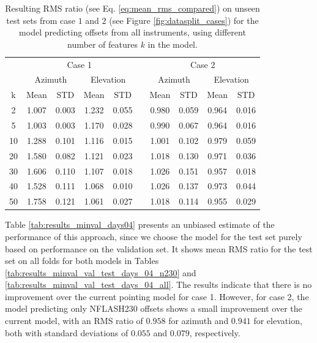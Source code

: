 \begin{table}[!htbp]
    \centering
    \caption{%
    Resulting RMS ratio (see Eq. \eqref{eq:mean_rms_compared}) on unseen test sets from case $1$ and $2$ (see Figure \ref{fig:datasplit_cases}) for the model predicting offsets from all instruments,
    using different number of features $k$ in the model.}
    \begin{tabular}{ccccc c cccc}
        \toprule
        \multicolumn{1}{c}{} & \multicolumn{4}{c}{Case 1} & & \multicolumn{4}{c}{Case 2} \\
        \cmidrule(lr){2-5} \cmidrule(lr){7-10}
        \multicolumn{1}{c}{} & \multicolumn{2}{c}{Azimuth} & \multicolumn{2}{c}{Elevation} & & \multicolumn{2}{c}{Azimuth} & \multicolumn{2}{c}{Elevation} \\ 
        \cmidrule(lr){2-5} \cmidrule(lr){7-10}
        k & Mean & STD & Mean & STD & & Mean & STD & Mean & STD \\ 
        \midrule
         2 &     1.007 &     0.003 &     1.232 &     0.055 &  &  0.980 &     0.059 &     0.964 &     0.016 \\
         5 &     1.003 &     0.003 &     1.170 &     0.028 &  &  0.990 &     0.067 &     0.964 &     0.016 \\
        10 &     1.288 &     0.101 &     1.116 &     0.015 &  &  1.001 &     0.102 &     0.979 &     0.059 \\
        20 &     1.580 &     0.082 &     1.121 &     0.023 &  &  1.018 &     0.130 &     0.971 &     0.036 \\
        30 &     1.606 &     0.110 &     1.107 &     0.018 &  &  1.026 &     0.151 &     0.957 &     0.018 \\
        40 &     1.528 &     0.111 &     1.068 &     0.010 &  &  1.026 &     0.137 &     0.973 &     0.044 \\
        50 &     1.758 &     0.121 &     1.061 &     0.027 &  &  1.018 &     0.114 &     0.955 &     0.029 \\
        \bottomrule
    \end{tabular}
    \label{tab:results_all_days}
\end{table}

\newpage

Table \ref{tab:results_minval_days04} presents an unbiased estimate of the performance of this approach,
since we choose the model for the test set purely based on performance on the validation set.
It shows mean RMS ratio for the test set on all folds for both models in Tables \ref{tab:results_minval_val_test_days_04_n230} and \ref{tab:results_minval_val_test_days_04_all}.
The results indicate that there is no improvement over the current pointing model for case 1.
However, for case 2, the model predicting only NFLASH230 offsets shows a small improvement over the current model,
with an RMS ratio of $0.958$ for azimuth and $0.941$ for elevation, both with standard deviations of $0.055$ and $0.079$, respectively.\\

